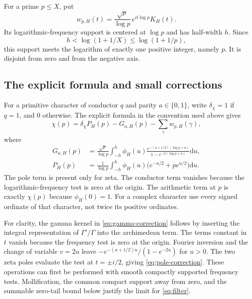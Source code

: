 \documentclass[11pt,letterpaper]{article}
\theoremstyle{definition}\newtheorem{definition}[theorem]{Definition}
\theoremstyle{remark}\newtheorem{remark}[theorem]{Remark}
\newcommand{\dd}{\mathrm{d}}
\begin{document}
For a prime $p\le X$, put
\begin{equation}\label{eq:wp}
 w_{p,H}(t)=\frac{\sqrt p}{\log p}\,e^{it\log p}K_H(t).
\end{equation}
Its logarithmic-frequency support is centered at $\log p$ and has
half-width $h$. Since
\[
 h<\log(1+1/X)\le\log(1+1/p),
\]
this support meets the logarithm of exactly one positive integer,
namely $p$. It is disjoint from zero and from the negative axis.

\subsection{The explicit formula and small corrections}

For a primitive character of conductor $q$ and parity $a\in\{0,1\}$,
write $\delta_\chi=1$ if $q=1$, and $0$ otherwise. The explicit formula
in the convention used above gives
\begin{equation}\label{eq:exact-isolation}
 \chi(p)=\delta_\chi P_H(p)-G_{a,H}(p)
                  -\sum_\gamma w_{p,H}(\gamma),
\end{equation}
where
\begin{align}
 G_{a,H}(p)
 &=\frac{\sqrt p}{\log p}\int_{-h}^h
  \phi_H(u)\frac{e^{-(a+1/2)(\log p+u)}}{1-e^{-2(\log p+u)}}\dd u,
       \label{eq:gamma-correction}\\
 P_H(p)&=\frac1{\log p}\int_{-h}^h\phi_H(u)
                \bigl(e^{-u/2}+p e^{u/2}\bigr)\dd u.
       \label{eq:pole-correction}
\end{align}
The pole term is present only for zeta. The conductor term vanishes
because the logarithmic-frequency test is zero at the origin.
The arithmetic term at $p$ is exactly $\chi(p)$ because
$\phi_H(0)=1$. For a complex character use every signed ordinate of
that character, not twice its positive ordinates.

For clarity, the gamma kernel in \eqref{eq:gamma-correction} follows
by inserting the integral representation of $\Gamma'/\Gamma$ into
the archimedean term. The terms constant in $t$ vanish because the
frequency test is zero at the origin. Fourier inversion and the change
of variable $v=2u$ leave
$-e^{-(a+1/2)u}/(1-e^{-2u})$ for $u>0$. The two zeta poles evaluate the
test at $t=\pm i/2$, giving \eqref{eq:pole-correction}.
These operations can first be performed with smooth compactly supported
frequency tests. Mollification, the common compact support away from
zero, and the summable zero-tail bound below justify the limit for
\eqref{eq:filter}.
\end{document}
